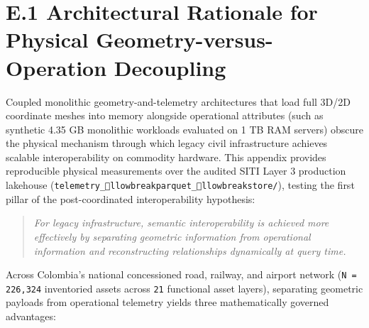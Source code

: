 \documentclass[10pt,a4paper]{article}
\begin{document}
\section*{E.1 Architectural Rationale for Physical Geometry-versus-Operation Decoupling}

Coupled monolithic geometry-and-telemetry architectures that load full 3D/2D coordinate meshes into memory alongside operational attributes (such as synthetic 4.35 GB monolithic workloads evaluated on 1 TB RAM servers) obscure the physical mechanism through which legacy civil infrastructure achieves scalable interoperability on commodity hardware. This appendix provides reproducible physical measurements over the audited SITI Layer 3 production lakehouse (\texttt{telemetry\_llowbreak{}parquet\_llowbreak{}store/}), testing the first pillar of the post-coordinated interoperability hypothesis:

\begin{quote}\small \textit{For legacy infrastructure, semantic interoperability is achieved more effectively by separating geometric information from operational information and reconstructing relationships dynamically at query time.}\end{quote}

Across Colombia's national concessioned road, railway, and airport network (\texttt{N = 226,324} inventoried assets across \texttt{21} functional asset layers), separating geometric payloads from operational telemetry yields three mathematically governed advantages:
\end{document}
